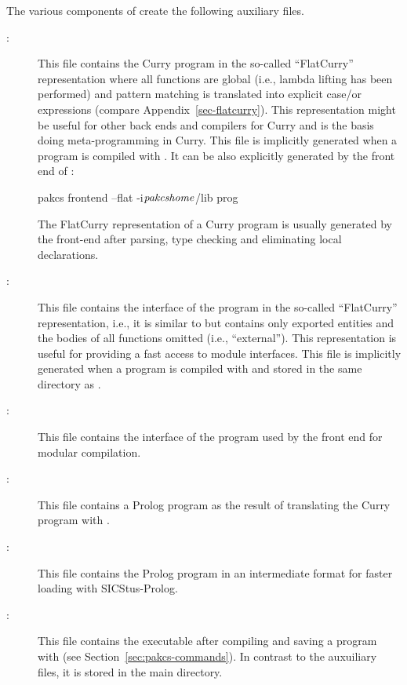 The various components of \CYS create the following auxiliary files.
\begin{description}
\item[:] This file contains the Curry program
in the so-called ``FlatCurry'' representation where all functions are global
(i.e., lambda lifting has been performed) and pattern matching
is translated into explicit case/or expressions
(compare Appendix~\ref{sec-flatcurry}).
This representation might be useful for other back ends and
compilers for Curry and is the basis doing meta-programming in Curry.
This file is implicitly
generated when a program is compiled with \CYS.
It can be also explicitly generated by the
front end of \CYS:
\begin{curry}
pakcs frontend --flat -i$\mbox{\textit{pakcshome}}$/lib prog
\end{curry}
The FlatCurry representation of a Curry program is usually
generated by the front-end after parsing, type checking and eliminating
local declarations.

\item[:] This file contains the interface
of the program in the so-called ``FlatCurry'' representation,
i.e., it is similar to  but contains only exported
entities and the bodies of all functions omitted (i.e., ``external'').
This representation is useful for providing a fast access
to module interfaces.
This file is implicitly generated when a program is compiled with \CYS
and stored in the same directory as .

\item[:] This file contains the interface
of the program used by the front end for modular compilation.

\item[:] This file contains a Prolog program
as the result of translating the Curry program with \CYS.

\item[:] This file contains the Prolog program
 in an intermediate format for faster loading
with SICStus-Prolog.

\item[:] This file contains the executable
after compiling and saving a program with \CYS
(see Section~\ref{sec:pakcs-commands}).
In contrast to the auxuiliary files, it is stored
in the main directory.

\end{description}


